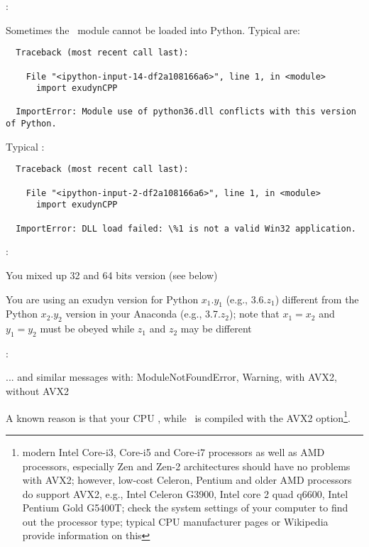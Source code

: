 \noindent {}:
\bi
  \item Sometimes the \codeName\ module cannot be loaded into Python. Typical  are: \vspace{1pt}\\
\plainlststyle
\begin{lstlisting}
  Traceback (most recent call last):

    File "<ipython-input-14-df2a108166a6>", line 1, in <module>
      import exudynCPP

  ImportError: Module use of python36.dll conflicts with this version of Python.
\end{lstlisting}
%
  Typical :\vspace{1pt}\\
\begin{lstlisting}
  Traceback (most recent call last):
  
    File "<ipython-input-2-df2a108166a6>", line 1, in <module>
      import exudynCPP

  ImportError: DLL load failed: \%1 is not a valid Win32 application.
\end{lstlisting}
%
:
\bi
\item[$\ra$] You mixed up 32 and 64 bits version (see below) 
\item[$\ra$] You are using an exudyn version for Python $x_1.y_1$ (e.g., 3.6.$z_1$) different from the Python $x_2.y_2$ version in your Anaconda (e.g., 3.7.$z_2$); note that $x_1=x_2$ and $y_1=y_2$ must be obeyed while $z_1$ and $z_2$ may be different
\ei
%
\item {}:
\bi
\item[$\ra$] ... and similar messages with: ModuleNotFoundError, Warning, with AVX2, without AVX2
\item[$\ra$] A known reason is that your CPU , while \codeName\ is compiled with the AVX2 option\footnote{modern Intel Core-i3, Core-i5 and Core-i7 processors as well as AMD processors, especially Zen and Zen-2 architectures should have no problems with AVX2; however, low-cost Celeron, Pentium and older AMD processors do  support AVX2, e.g.,  Intel Celeron G3900, Intel core 2 quad q6600, Intel Pentium Gold G5400T; check the system settings of your computer to find out the processor type; typical CPU manufacturer pages or Wikipedia provide information on this}.
